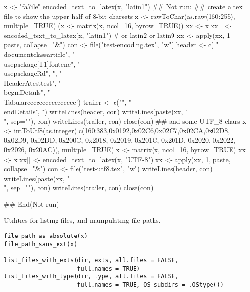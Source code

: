 \begin{Examples}
\begin{ExampleCode}
x <- "fa\xE7ile"
encoded_text_to_latex(x, "latin1")
## Not run: 
## create a tex file to show the upper half of 8-bit charsets
x <- rawToChar(as.raw(160:255), multiple=TRUE)
(x <- matrix(x, ncol=16, byrow=TRUE))
xx <- x
xx[] <- encoded_text_to_latex(x, "latin1") # or latin2 or latin9
xx <- apply(xx, 1, paste, collapse="&")
con <- file("test-encoding.tex", "w")
header <- c(
"\\documentclass{article}",
"\\usepackage[T1]{fontenc}",
"\\usepackage{Rd}",
"\",
"\\HeaderA{test}{}{test}",
"\\begin{Details}\relax",
"\\Tabular{cccccccccccccccc}{")
trailer <- c("}", "\\end{Details}", "\")
writeLines(header, con)
writeLines(paste(xx, "\\", sep=""), con)
writeLines(trailer, con)
close(con)
## and some UTF_8 chars
x <- intToUtf8(as.integer(
    c(160:383,0x0192,0x02C6,0x02C7,0x02CA,0x02D8,
      0x02D9, 0x02DD, 0x200C, 0x2018, 0x2019, 0x201C,
      0x201D, 0x2020, 0x2022, 0x2026, 0x20AC)),
               multiple=TRUE)
x <- matrix(x, ncol=16, byrow=TRUE)
xx <- x
xx[] <- encoded_text_to_latex(x, "UTF-8")
xx <- apply(xx, 1, paste, collapse="&")
con <- file("test-utf8.tex", "w")
writeLines(header, con)
writeLines(paste(xx, "\\", sep=""), con)
writeLines(trailer, con)
close(con)

## End(Not run)
\end{ExampleCode}
\end{Examples}
%
\begin{Description}\relax
Utilities for listing files, and manipulating file paths.
\end{Description}
%
\begin{Usage}
\begin{verbatim}
file_path_as_absolute(x)
file_path_sans_ext(x)

list_files_with_exts(dir, exts, all.files = FALSE,
                     full.names = TRUE)
list_files_with_type(dir, type, all.files = FALSE,
                     full.names = TRUE, OS_subdirs = .OStype())
\end{verbatim}
\end{Usage}
